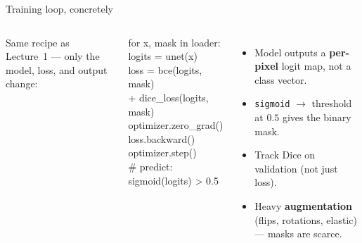 \documentclass[
11pt,notheorems,hyperref={pdfauthor=whatever}
]{beamer}
\begin{document}
\begin{frame}{Training loop, concretely}
\small
\begin{columns}[c,onlytextwidth]
    Same recipe as Lecture~1 --- only the \alert{model}, \alert{loss}, and \alert{output}
    change:
    \begin{tcolorbox}[colback=black, colframe=accGreen!60!black, coltext=white,
        arc=3pt, boxrule=1pt, fontupper=\scriptsize\ttfamily]
    for x, mask in loader:\\
    \hspace*{1.5em}logits = unet(x)\\
    \hspace*{1.5em}loss = bce(logits, mask)\\
    \hspace*{3.0em}+ dice\_loss(logits, mask)\\
    \hspace*{1.5em}optimizer.zero\_grad()\\
    \hspace*{1.5em}loss.backward()\\
    \hspace*{1.5em}optimizer.step()\\
    \# predict: sigmoid(logits) > 0.5
    \end{tcolorbox}

    \begin{itemize}\setlength\itemsep{0.45em}
        \item Model outputs a \textbf{per-pixel} logit map, not a class vector.
        \item \texttt{sigmoid} $\to$ threshold at $0.5$ gives the binary mask.
        \item Track \alert{Dice} on validation (not just loss).
        \item Heavy \textbf{augmentation} (flips, rotations, elastic) --- masks are scarce.
    \end{itemize}
\end{columns}
\end{frame}
\end{document}
